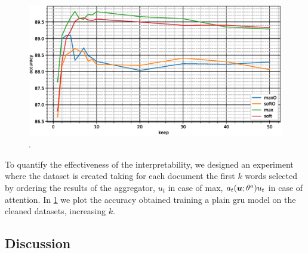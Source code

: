 \begin{figure}
  \centering
  \includegraphics[width=\floatwidth]{img/plotSintex.eps}
  \caption{.}
  \label{fig:sintex}
\end{figure}
To quantify the effectiveness of the interpretability, we designed an
experiment where the dataset is created taking for each document the
first $k$ words selected by  
ordering the results of the aggregator, $u_t$ in case of max,
$a_t(\bm{u};\theta^a)u_t$ in case of attention. In \cref{fig:sintex}
we plot the accuracy obtained training a plain \ac{gru} model on the
cleaned datasets, increasing $k$. 

\subsection{Discussion}






